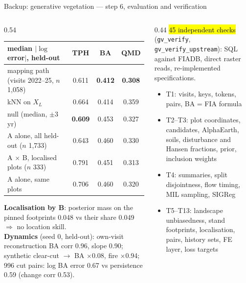 \begin{frame}{Backup: generative vegetation — step 6, evaluation and verification}
\scriptsize
\begin{columns}[T]
\begin{column}{0.54\textwidth}
\renewcommand{\arraystretch}{1.1}
\begin{tabular}{@{}lccc@{}}
\toprule
median $|\log$ error$|$, held-out & TPH & BA & QMD \\
\midrule
mapping path (visits 2022–25, $n$ 1,058) & 0.611 & \textbf{0.412} & \textbf{0.308} \\
\quad kNN on $X_L$ & 0.664 & 0.414 & 0.359 \\
\quad null (median, $\pm$3 yr) & \textbf{0.609} & 0.453 & 0.327 \\
A alone, all held-out ($n$ 1,733) & 0.643 & 0.460 & 0.330 \\
A $\times$ B, localised plots ($n$ 333) & 0.791 & 0.451 & 0.313 \\
\quad A alone, same plots & 0.706 & 0.460 & 0.320 \\
\bottomrule
\end{tabular}

\smallskip
\textbf{Localisation by B}: posterior mass on the pinned footprints 0.048 vs their share 0.049 $\Rightarrow$ no location skill.\\
\textbf{Dynamics} (seed 0, held-out): own-visit reconstruction BA corr 0.96, slope 0.90; synthetic clear-cut $\rightarrow$ BA $\times$0.08, fire $\times$0.94; 996 cut pairs: log BA error 0.67 vs persistence 0.59 (change corr 0.53).
\end{column}
\begin{column}{0.44\textwidth}
\hl{45 independent checks} (\texttt{gv\_verify}, \texttt{gv\_verify\_upstream}): SQL against FIADB, direct raster reads, re-implemented specifications.
\begin{itemize}\setlength\itemsep{1pt}
\item T1: visits, keys, tokens, pairs, BA = FIA formula
\item T2–T3: plot coordinates, candidates, AlphaEarth, soils, disturbance and Hansen fractions, prior, inclusion weights
\item T4: summaries, split disjointness, flow timing, MIL sampling, SIGReg
\item T5–T13: landscape unbiasedness, stand footprints, localisation, pairs, history sets, FE layer, loss targets
\end{itemize}
\end{column}
\end{columns}
\end{frame}
